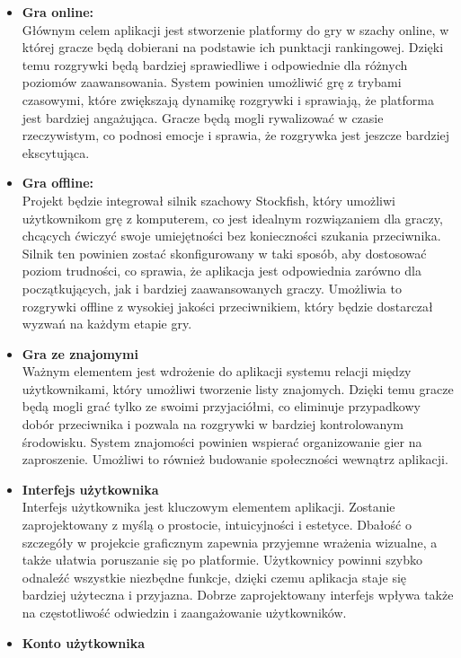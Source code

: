 \documentclass[12pt,a4paper]{article}
\begin{document}
\begin{itemize}
    \item \textbf{Gra online:}\\
    Głównym celem aplikacji jest stworzenie platformy do gry w szachy online, w której gracze będą dobierani na podstawie ich punktacji rankingowej. Dzięki temu rozgrywki będą bardziej sprawiedliwe i odpowiednie dla różnych poziomów zaawansowania. System powinien umożliwić grę z trybami czasowymi, które zwiększają dynamikę rozgrywki i sprawiają, że platforma jest bardziej angażująca. Gracze będą mogli rywalizować w czasie rzeczywistym, co podnosi emocje i sprawia, że rozgrywka jest jeszcze bardziej ekscytująca.
    \item \textbf{Gra offline:}\\
    Projekt będzie integrował silnik szachowy Stockfish, który umożliwi użytkownikom grę z komputerem, co jest idealnym rozwiązaniem dla graczy, chcących ćwiczyć swoje umiejętności bez konieczności szukania przeciwnika. Silnik ten powinien zostać skonfigurowany w taki sposób, aby dostosować poziom trudności, co sprawia, że aplikacja jest odpowiednia zarówno dla początkujących, jak i bardziej zaawansowanych graczy. Umożliwia to rozgrywki offline z wysokiej jakości przeciwnikiem, który będzie dostarczał wyzwań na każdym etapie gry.
    \item \textbf{Gra ze znajomymi}\\
    Ważnym elementem jest wdrożenie do aplikacji systemu relacji między użytkownikami, który umożliwi tworzenie listy znajomych. Dzięki temu gracze będą mogli grać tylko ze swoimi przyjaciółmi, co eliminuje przypadkowy dobór przeciwnika i pozwala na rozgrywki w bardziej kontrolowanym środowisku. System znajomości powinien wspierać organizowanie gier na zaproszenie. Umożliwi to również budowanie społeczności wewnątrz aplikacji.
    \item \textbf{Interfejs użytkownika}\\
    Interfejs użytkownika jest kluczowym elementem aplikacji. Zostanie zaprojektowany z myślą o prostocie, intuicyjności i estetyce. Dbałość o szczegóły w projekcie graficznym zapewnia przyjemne wrażenia wizualne, a także ułatwia poruszanie się po platformie. Użytkownicy powinni szybko odnaleźć wszystkie niezbędne funkcje, dzięki czemu aplikacja staje się bardziej użyteczna i przyjazna. Dobrze zaprojektowany interfejs wpływa także na częstotliwość odwiedzin i zaangażowanie użytkowników.
    \item \textbf{Konto użytkownika}\\

\end{itemize}
\end{document}
